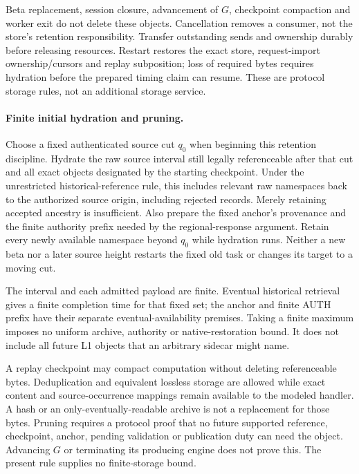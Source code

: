 Beta replacement, session closure, advancement of $G$, checkpoint
compaction and worker exit do not delete these objects. Cancellation
removes a consumer, not the store's retention responsibility. Transfer
outstanding sends and ownership durably before releasing resources.
Restart restores the exact store, request-import ownership/cursors and
replay subposition; loss of required
bytes requires hydration before the prepared timing claim can resume.
These are protocol storage rules, not an additional storage service.

\paragraph{Finite initial hydration and pruning.}
\label{sec:source-hydration}
Choose a fixed authenticated source cut $q_0$ when beginning this
retention discipline. Hydrate the raw source interval still legally
referenceable after that cut and all exact objects designated by the
starting checkpoint. Under the unrestricted historical-reference rule,
this includes relevant raw namespaces back to the authorized source
origin, including rejected records. Merely retaining accepted ancestry
is insufficient. Also prepare the fixed anchor's provenance and the
finite authority prefix needed by the regional-response argument.
Retain every newly available namespace beyond $q_0$ while hydration
runs. Neither a new beta nor a later source height restarts the fixed
old task or changes its target to a moving cut.

The interval and each admitted payload are finite. Eventual historical
retrieval gives a finite completion time for that fixed set; the anchor
and finite AUTH prefix have their separate eventual-availability
premises. Taking a finite maximum imposes no uniform archive,
authority or native-restoration bound. It does not include all future
L1 objects that an arbitrary sidecar might name.

A replay checkpoint may compact computation without deleting
referenceable bytes. Deduplication and equivalent lossless storage are
allowed while exact content and source-occurrence mappings remain
available to the modeled handler. A hash or an only-eventually-readable
archive is not a replacement for those bytes. Pruning requires a
protocol proof that no future supported reference, checkpoint,
anchor, pending validation or publication duty can need the object.
Advancing $G$ or terminating its producing engine does not prove this.
The present rule supplies no finite-storage bound.

